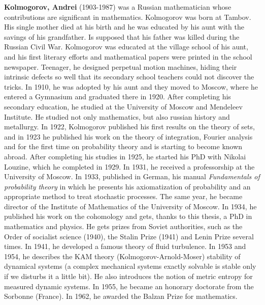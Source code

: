 \textbf{Kolmogorov, Andrei} (1903-1987) was a Russian mathematician whose contributions are significant in mathematics. Kolmogorov was born at Tambov. His single mother died at his birth and he was educated by his aunt with the savings of his grandfather. Is supposed that his father was killed during the Russian Civil War. Kolmogorov was educated at the village school of his aunt, and his first literary efforts and mathematical papers were printed in the school newspaper. Teenager, he designed perpetual motion machines, hiding their intrinsic defects so well that its secondary school teachers could not discover the tricks. In 1910, he was adopted by his aunt and they moved to Moscow, where he entered a Gymnasium and graduated there in 1920. After completing his secondary education, he studied at the University of Moscow and Mendeleev Institute. He studied not only mathematics, but also russian history and metallurgy. In 1922, Kolmogorov published his first results on the theory of sets, and in 1923 he published his work on the theory of integration, Fourier analysis and for the first time on probability theory and is starting to become known abroad. After completing his studies in 1925, he started his PhD with Nikolai Louzine, which he completed in 1929. In 1931, he received a professorship at the University of Moscow. In 1933, published in German, his manual \textit{Fundamentals of probability theory} in which he presents his axiomatization of probability and an appropriate method to treat stochastic processes. The same year, he became director of the Institute of Mathematics of the University of Moscow. In 1934, he published his work on the cohomology and gets, thanks to this thesis, a PhD in mathematics and physics. He gets prizes from Soviet authorities, such as the Order of socialist science (1940), the Stalin Prize (1941) and Lenin Prize several times. In 1941, he developed a famous theory of fluid turbulence. In 1953 and 1954, he describes the KAM theory (Kolmogorov-Arnold-Moser) stability of dynamical systems (a complex mechanical systems exactly solvable is stable only if we disturbs it a little bit). He also introduces the notion of metric entropy for measured dynamic systems. In 1955, he became an honorary doctorate from the Sorbonne (France). In 1962, he awarded the Balzan Prize for mathematics.

